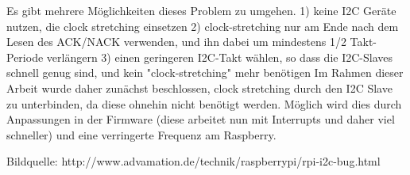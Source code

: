 Es gibt mehrere Möglichkeiten dieses Problem zu umgehen. 
1)	keine I2C Geräte nutzen, die clock stretching einsetzen
2)	clock-stretching nur am Ende nach dem Lesen des ACK/NACK verwenden, und ihn dabei um mindestens 1/2 Takt-Periode verlängern
3)	einen geringeren I2C-Takt wählen, so dass die I2C-Slaves schnell genug sind, und kein "clock-stretching" mehr benötigen
Im Rahmen dieser Arbeit wurde daher zunächst beschlossen, clock stretching durch den I2C Slave zu unterbinden, da diese ohnehin nicht benötigt werden. Möglich wird dies durch Anpassungen in der Firmware (diese arbeitet nun mit Interrupts und daher viel schneller) und eine verringerte Frequenz am Raspberry.



Bildquelle: http://www.advamation.de/technik/raspberrypi/rpi-i2c-bug.html


